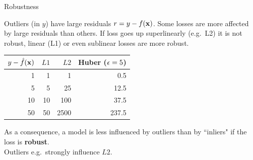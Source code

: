 \documentclass[11pt,compress,t,notes=noshow, xcolor=table]{beamer}
\begin{document}
\begin{vbframe}{Robustness}

\small

Outliers (in $y$) have large residuals $r = y - f(\mathbf{x})$. Some losses are more
affected by large residuals than others. If loss goes up superlinearly (e.g.\ L2) it is not robust, linear (L1) or even sublinear losses are more robust.

\vspace{0.5cm}

\begin{minipage}[c]{0.5\textwidth}
  \footnotesize
  \begin{table}[]
  \begin{tabular}{r|r|r|r}
  \toprule
  $y - \hat{f}(\mathbf{x})$ & $L1$ & $L2$ & Huber ($\epsilon = 5$) \\ \hline
  1 & 1 & 1 & 0.5 \\
  5 & 5 & 25 & 12.5 \\
  10 & 10 & 100 & 37.5 \\
  50 & 50 & 2500  & 237.5
\end{tabular}
\end{table}
\end{minipage}%
\begin{minipage}[c]{0.05\textwidth}
  \phantom{foo}
\end{minipage}%
\begin{minipage}[c]{0.45\textwidth}
  \small
  As a consequence, a model is less influenced by outliers than by ``inliers" if 
  the loss is \textbf{robust}.\\
  Outliers e.g.\ strongly influence $L2$.
\end{minipage}%

\vfill



\end{vbframe}
\end{document}
